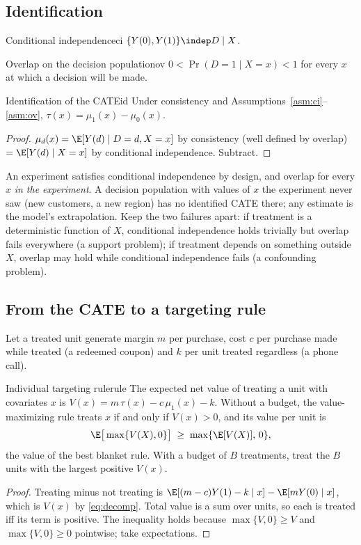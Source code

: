 \documentclass[11pt]{article}
\begin{document}
\subsection{Identification}

\begin{assum}{Conditional independence}{ci}
$\{Y(0), Y(1)\} \indep D \mid X$.
\end{assum}
\begin{assum}{Overlap on the decision population}{ov}
$0 < \Pr(D=1 \mid X=x) < 1$ for every $x$ at which a decision will be made.
\end{assum}
\begin{prop}{Identification of the CATE}{id}
Under consistency and Assumptions~\ref{asm:ci}--\ref{asm:ov}, $\tau(x) = \mu_1(x) - \mu_0(x)$.
\end{prop}
\begin{proof}
$\mu_d(x) = \E[Y(d) \mid D=d, X=x]$ by consistency (well defined by overlap) $= \E[Y(d) \mid X=x]$ by
conditional independence. Subtract.
\end{proof}

An experiment satisfies conditional independence by design, and overlap for every $x$ \emph{in the
experiment}. A decision population with values of $x$ the experiment never saw (new customers, a new
region) has no identified CATE there; any estimate is the model's extrapolation. Keep the two failures
apart: if treatment is a deterministic function of $X$, conditional independence holds trivially but overlap
fails everywhere (a support problem); if treatment depends on something outside $X$, overlap may hold while
conditional independence fails (a confounding problem).

\subsection{From the CATE to a targeting rule}

Let a treated unit generate margin $m$ per purchase, cost $c$ per purchase made while treated (a redeemed
coupon) and $k$ per unit treated regardless (a phone call).

\begin{prop}{Individual targeting rule}{rule}
The expected net value of treating a unit with covariates $x$ is $V(x) = m\,\tau(x) - c\,\mu_1(x) - k$.
Without a budget, the value-maximizing rule treats $x$ if and only if $V(x) > 0$, and its value per unit is
\[
  \E\big[\max\{V(X), 0\}\big] \;\ge\; \max\{\E[V(X)],\, 0\},
\]
the value of the best blanket rule. With a budget of $B$ treatments, treat the $B$ units with the largest
positive $V(x)$.
\end{prop}
\begin{proof}
Treating minus not treating is $\E[(m-c)Y(1) - k \mid x] - \E[mY(0) \mid x]$, which is $V(x)$ by
\eqref{eq:decomp}. Total value is a sum over units, so each is treated iff its term is positive. The inequality
holds because $\max\{V,0\} \ge V$ and $\max\{V,0\} \ge 0$ pointwise; take expectations.
\end{proof}
\end{document}
